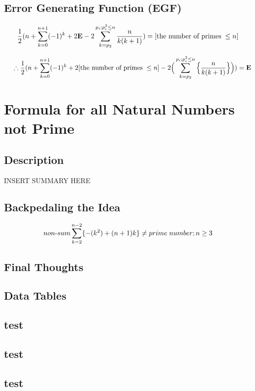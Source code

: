 \documentclass[12pt, letterpaper, twosided]{report}
\begin{document}
\section{Error Generating Function (EGF)}
\hspace{0.5cm}

$$\frac{1}{2}(n+\sum_{k=0}^{n+1}(-1)^{k}+2\text{\textbf{E}} -2\sum_{k=p_{2}}^{p_{i};p_{i}^{2}\leq n}\frac{n}{k(k+1)}) = [\text{the number of primes}\hspace{0.1cm}\leq n]$$

$$\hspace{.5cm}\therefore
\frac{1}{2}(n+\sum_{k=0}^{n+1}(-1)^{k}+2 [\text{the number of primes}\hspace{0.1cm}\leq n] -2\Big( \sum_{k=p_{2}}^{p_{i};p_{i}^{2}\leq n} \Big\{  \frac{n}{k(k+1)} \Big\}  \Big)) = \text{\textbf{E}}$$




\chapter{Formula for all Natural Numbers not Prime}%

\section*{Description}
\hspace{0.5cm}INSERT SUMMARY HERE

\section{Backpedaling the Idea}
\hspace{0.5cm}


$$non\text{-}sum\sum_{k=2}^{n-2}\{  -(k^2)+(n+1)k  \} \neq prime \hspace{0.1cm} number; n \geq 3$$


\newpage
\section*{Final Thoughts}%
\hspace{0.5cm}

\newpage
\section*{Data Tables}%
\hspace{0.5cm}
\section*{test}
\section*{test}
\section*{test}

	
\end{document}

